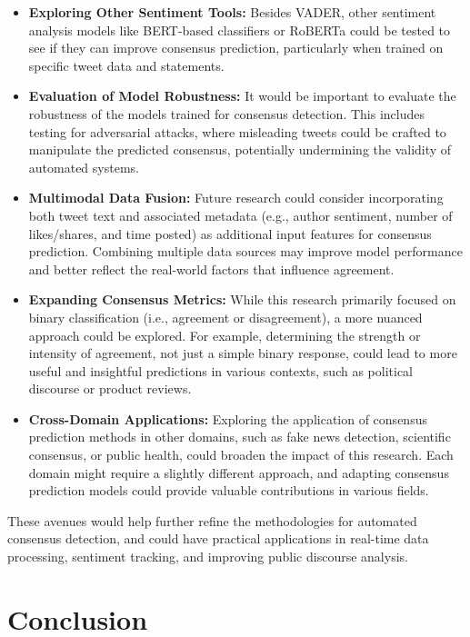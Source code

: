 \documentclass[14]{article}
\begin{document}
\begin{itemize}
    \item \textbf{Exploring Other Sentiment Tools:} Besides VADER, other sentiment analysis models like BERT-based classifiers or RoBERTa \cite{roberta} could be tested to see if they can improve consensus prediction, particularly when trained on specific tweet data and statements.
    
    \item \textbf{Evaluation of Model Robustness:} It would be important to evaluate the robustness of the models trained for consensus detection. This includes testing for adversarial attacks, where misleading tweets could be crafted to manipulate the predicted consensus, potentially undermining the validity of automated systems.
    
    \item \textbf{Multimodal Data Fusion:} Future research could consider incorporating both tweet text and associated metadata (e.g., author sentiment, number of likes/shares, and time posted) as additional input features for consensus prediction. Combining multiple data sources may improve model performance and better reflect the real-world factors that influence agreement.
    
    \item \textbf{Expanding Consensus Metrics:} While this research primarily focused on binary classification (i.e., agreement or disagreement), a more nuanced approach could be explored. For example, determining the strength or intensity of agreement, not just a simple binary response, could lead to more useful and insightful predictions in various contexts, such as political discourse or product reviews.
    
    \item \textbf{Cross-Domain Applications:} Exploring the application of consensus prediction methods in other domains, such as fake news detection, scientific consensus, or public health, could broaden the impact of this research. Each domain might require a slightly different approach, and adapting consensus prediction models could provide valuable contributions in various fields.
\end{itemize}

These avenues would help further refine the methodologies for automated consensus detection, and could have practical applications in real-time data processing, sentiment tracking, and improving public discourse analysis.

\section*{Conclusion}
\end{document}
